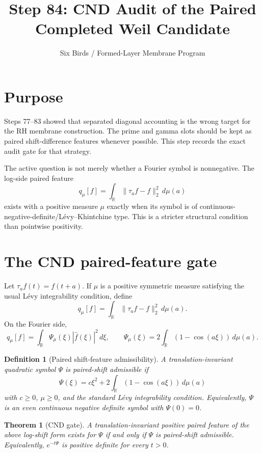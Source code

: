 \documentclass[11pt]{article}
\title{Step 84: CND Audit of the Paired Completed Weil Candidate}
\author{Six Birds / Formed-Layer Membrane Program}
\date{}
\newtheorem{theorem}{Theorem}
\newtheorem{definition}{Definition}
\begin{document}
\maketitle

\section{Purpose}
Steps 77--83 showed that separated diagonal accounting is the wrong target for the
RH membrane construction.  The prime and gamma slots should be kept as paired
shift-difference features whenever possible.  This step records the exact audit gate
for that strategy.

The active question is not merely whether a Fourier symbol is nonnegative.  The
log-side paired feature
\[
        q_\mu[f]=\int_{\mathbb R}\|\tau_a f-f\|_2^2\,d\mu(a)
\]
exists with a positive measure \(\mu\) exactly when its symbol is of
continuous-negative-definite/L\'evy--Khintchine type.  This is a stricter structural
condition than pointwise positivity.

\section{The CND paired-feature gate}
Let \(\tau_a f(t)=f(t+a)\).  If \(\mu\) is a positive symmetric measure satisfying the
usual L\'evy integrability condition, define
\[
        q_\mu[f]=\int_{\mathbb R}\|\tau_a f-f\|_2^2\,d\mu(a).
\]
On the Fourier side,
\[
        q_\mu[f]=\int_{\mathbb R}\Psi_\mu(\xi)|\widehat f(\xi)|^2\,d\xi,
        \qquad
        \Psi_\mu(\xi)=2\int_{\mathbb R}(1-\cos(a\xi))\,d\mu(a).
\]

\begin{definition}[Paired shift-feature admissibility]
A translation-invariant quadratic symbol \(\Psi\) is paired-shift admissible if
\[
        \Psi(\xi)=c\xi^2+2\int_{\mathbb R}(1-\cos(a\xi))\,d\mu(a)
\]
with \(c\ge0\), \(\mu\ge0\), and the standard L\'evy integrability condition.
Equivalently, \(\Psi\) is an even continuous negative definite symbol with
\(\Psi(0)=0\).
\end{definition}

\begin{theorem}[CND gate]
A translation-invariant positive paired feature of the above log-shift form exists
for \(\Psi\) if and only if \(\Psi\) is paired-shift admissible.  Equivalently,
\(e^{-t\Psi}\) is positive definite for every \(t>0\).
\end{theorem}
\end{document}
